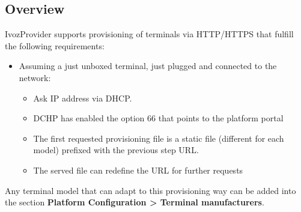 \documentclass[letterpaper,10pt,english]{sphinxmanual}
\begin{document}
\subsection{Overview}
\label{administration_portal/platform/terminal_manufacturers:overview}
IvozProvider supports provisioning of terminals via HTTP/HTTPS that fulfill the
following requirements:
\begin{itemize}
\item {} 
Assuming a just unboxed terminal, just plugged and connected to the network:
\begin{itemize}
\item {} 
Ask IP address via DHCP.

\item {} 
DCHP has enabled the option 66 that points to the platform portal

\item {} 
The first requested provisioning file is a static file (different for each
model) prefixed with the previous step URL.

\item {} 
The served file can redefine the URL for further requests

\end{itemize}

\end{itemize}

Any terminal model that can adapt to this provisioning way can be added into
the section \textbf{Platform Configuration \textgreater{} Terminal manufacturers}.
\end{document}
